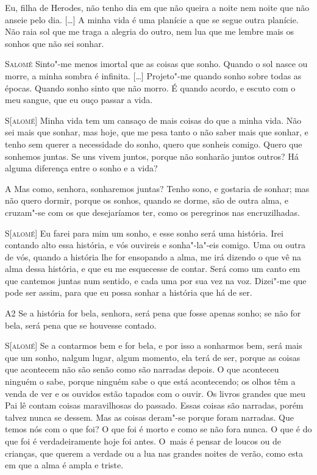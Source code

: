 Eu, filha de Herodes, não tenho dia em que não queira a noite nem noite
que não anseie pelo dia. [\ldots{}] A minha vida é uma planície a que se
segue outra planície. Não raia sol que me traga a alegria do outro,
nem lua que me lembre mais os sonhos que não sei sonhar.

\textsc{Salomé} Sinto"-me menos imortal que as coisas que sonho. Quando o
sol nasce ou morre, a minha sombra é infinita. [\ldots{}] Projeto"-me
quando sonho sobre todas as épocas. Quando sonho sinto que não morro.
É quando acordo, e escuto com o meu sangue, que eu ouço passar a
vida.

\textsc{S[alomé]} Minha vida tem um cansaço de mais coisas do que a minha
vida. Não sei mais que sonhar, mas hoje, que me pesa tanto o não
saber mais que sonhar, e tenho sem querer a necessidade do sonho,
quero que sonheis comigo. Quero que sonhemos juntas. Se uns vivem
juntos, porque não sonharão juntos outros? Há alguma diferença entre
o sonho e a vida?

\textsc{A} Mas como, senhora, sonharemos juntas? Tenho sono, e gostaria de
sonhar; mas não quero dormir, porque os sonhos, quando se dorme, são
de outra alma, e cruzam"-se com os que desejaríamos ter, como os
peregrinos nas encruzilhadas.

\textsc{S[alomé]} Eu farei para mim um sonho, e esse sonho será uma história.
Irei contando alto essa história, e vós ouvireis e sonha"-la"-eis
comigo. Uma ou outra de vós, quando a história lhe for ensopando a
alma, me irá dizendo o que vê na alma dessa história, e que eu me
esquecesse de contar. Será como um canto em que cantemos juntas num
sentido, e cada uma por sua vez na voz. Dizei"-me que pode ser assim,
para que eu possa sonhar a história que há de ser.

\textsc{A2} Se a história for bela, senhora, será pena que fosse apenas
sonho; se não for bela, será pena que se houvesse contado.

\textsc{S[alomé]} Se a contarmos bem e for bela, e por isso a sonharmos bem,
será mais que um sonho, nalgum lugar, algum momento, ela terá de ser,
porque as coisas que acontecem não são senão como são narradas
depois. O que aconteceu ninguém o sabe, porque ninguém sabe o que
está acontecendo; os olhos têm a venda de ver e os ouvidos estão
tapados com o ouvir. Os livros grandes que meu Pai lê contam coisas
maravilhosas do passado. Essas coisas são narradas, porém talvez
nunca se dessem. Mas as coisas deram"-se porque foram narradas. Que
temos nós com o que foi? O que foi é morto e como se não fora nunca.
O que é do que foi é verdadeiramente hoje foi antes. O~mais é pensar
de loucos ou de crianças, que querem a verdade ou a lua nas grandes
noites de verão, como esta em que a alma é ampla e triste.

